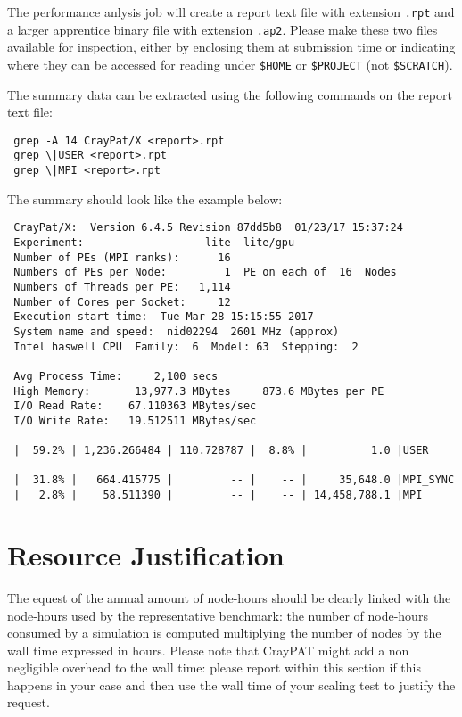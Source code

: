 \documentclass[11pt]{article}
\begin{document}
The performance anlysis job will create a report text file with extension \verb!.rpt! 
and a larger apprentice binary file with extension \verb!.ap2!. 
Please make these two files available for inspection, either by enclosing them at submission time or 
indicating where they can be accessed for reading under \verb!$HOME! or \verb!$PROJECT! (not \verb!$SCRATCH!).  

The summary data can be extracted using the following commands on the report text file:
\begin{verbatim}
 grep -A 14 CrayPat/X <report>.rpt
 grep \|USER <report>.rpt
 grep \|MPI <report>.rpt
\end{verbatim}

The summary should look like the example below: 
\begin{verbatim}
 CrayPat/X:  Version 6.4.5 Revision 87dd5b8  01/23/17 15:37:24
 Experiment:                   lite  lite/gpu     
 Number of PEs (MPI ranks):      16
 Numbers of PEs per Node:         1  PE on each of  16  Nodes
 Numbers of Threads per PE:   1,114
 Number of Cores per Socket:     12
 Execution start time:  Tue Mar 28 15:15:55 2017
 System name and speed:  nid02294  2601 MHz (approx)
 Intel haswell CPU  Family:  6  Model: 63  Stepping:  2
 
 Avg Process Time:     2,100 secs             
 High Memory:       13,977.3 MBytes     873.6 MBytes per PE
 I/O Read Rate:    67.110363 MBytes/sec       
 I/O Write Rate:   19.512511 MBytes/sec
 
 |  59.2% | 1,236.266484 | 110.728787 |  8.8% |          1.0 |USER
 
 |  31.8% |   664.415775 |         -- |    -- |     35,648.0 |MPI_SYNC
 |   2.8% |    58.511390 |         -- |    -- | 14,458,788.1 |MPI
\end{verbatim}

\section{Resource Justification}
The equest of the annual amount of node-hours should be clearly linked with the node-hours used 
by the representative benchmark: the number of node-hours consumed by a simulation is computed 
multiplying the number of nodes by the wall time expressed in hours. 
Please note that CrayPAT might add a non negligible overhead to the wall time: please report 
within this section if this happens in your case and then use the wall time of your scaling test 
to justify the request.
\end{document}
